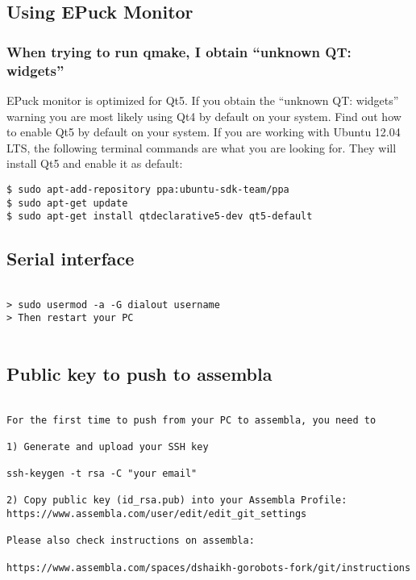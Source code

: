 \subsection{Using EPuck Monitor}

\subsubsection{When trying to run qmake, I obtain ``unknown QT: widgets''}
EPuck monitor is optimized for Qt5. If you obtain the ``unknown QT: widgets'' warning you are most likely using Qt4 by default on your system. Find out how to enable Qt5 by default on your system. If you are working with Ubuntu 12.04 LTS, the following terminal commands are what you are looking for. They will install Qt5 and enable it as default:
\begin{lstlisting}
$ sudo apt-add-repository ppa:ubuntu-sdk-team/ppa
$ sudo apt-get update
$ sudo apt-get install qtdeclarative5-dev qt5-default
\end{lstlisting}


\subsection{Serial interface}

\begin{lstlisting}

> sudo usermod -a -G dialout username
> Then restart your PC


\end{lstlisting}

\subsection{Public key to push to assembla}

\begin{lstlisting}

For the first time to push from your PC to assembla, you need to

1) Generate and upload your SSH key

ssh-keygen -t rsa -C "your email"

2) Copy public key (id_rsa.pub) into your Assembla Profile:
https://www.assembla.com/user/edit/edit_git_settings

Please also check instructions on assembla:

https://www.assembla.com/spaces/dshaikh-gorobots-fork/git/instructions


\end{lstlisting}



